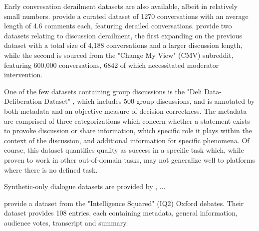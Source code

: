 Early convresation derailment datasets are also available, albeit in relatively small numbers. \cite{zhang-2018-gone-awry} provide a curated dataset of 1270 conversations with an average length of 4.6 comments each, featuring derailed conversations. \cite{chang-danescu-niculescu-mizil-2019-trouble} provide two datasets relating to discussion derailment, the first expanding on the previous dataset with a total size of 4,188 conversations and a larger discussion length, while the second is sourced from the "Change My View" (CMV) subreddit, featuring 600,000 conversations, 6842 of which necessitated moderator intervention.

One of the few datasets containing group discussions is the "Deli Data-Deliberation Dataset" \cite{karadzhov2023delidata}, which includes 500 group discussions, and is annotated by both metadata and an objective measure of decision correctness. The metadata are comprised of three categorizations which concern whether a statement exists to provoke discussion or share information, which specific role it plays within the context of the discussion, and additional information for specific phenomena. Of course, this dataset quantifies quality as success in a specific task which, while proven to work in other out-of-domain tasks, may not generalize well to platforms where there is no defined task.

Synthetic-only dialogue datasets are provided by \cite{lambert2024selfdirectedsyntheticdialoguesrevisions}, ... %

\cite{zhang2016-oxford} provide a dataset from the "Intelligence Squared" (IQ2) Oxford debates. Their dataset provides 108 entries, each containing metadata, general information, audience votes, transcript and summary.

